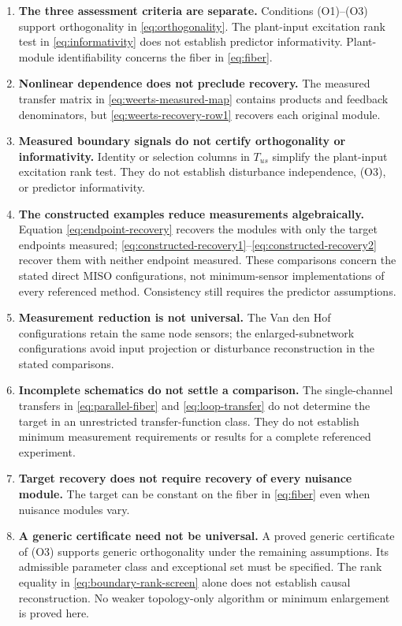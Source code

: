 \documentclass[11pt,a4paper]{article}
\begin{document}
\begin{enumerate}
  \item \textbf{The three assessment criteria are separate.}  Conditions (O1)--(O3) support orthogonality in \eqref{eq:orthogonality}.  The plant-input excitation rank test in \eqref{eq:informativity} does not establish predictor informativity.  Plant-module identifiability concerns the fiber in \eqref{eq:fiber}.

  \item \textbf{Nonlinear dependence does not preclude recovery.}  The measured transfer matrix in \eqref{eq:weerts-measured-map} contains products and feedback denominators, but \eqref{eq:weerts-recovery-row1} recovers each original module.

  \item \textbf{Measured boundary signals do not certify orthogonality or informativity.}  Identity or selection columns in $T_{us}$ simplify the plant-input excitation rank test.  They do not establish disturbance independence, (O3), or predictor informativity.

  \item \textbf{The constructed examples reduce measurements algebraically.}  Equation \eqref{eq:endpoint-recovery} recovers the modules with only the target endpoints measured; \eqref{eq:constructed-recovery1}--\eqref{eq:constructed-recovery2} recover them with neither endpoint measured.  These comparisons concern the stated direct MISO configurations, not minimum-sensor implementations of every referenced method.  Consistency still requires the predictor assumptions.

  \item \textbf{Measurement reduction is not universal.}  The Van den Hof configurations retain the same node sensors; the enlarged-subnetwork configurations avoid input projection or disturbance reconstruction in the stated comparisons.

  \item \textbf{Incomplete schematics do not settle a comparison.}  The single-channel transfers in \eqref{eq:parallel-fiber} and \eqref{eq:loop-transfer} do not determine the target in an unrestricted transfer-function class.  They do not establish minimum measurement requirements or results for a complete referenced experiment.

  \item \textbf{Target recovery does not require recovery of every nuisance module.}  The target can be constant on the fiber in \eqref{eq:fiber} even when nuisance modules vary.

  \item \textbf{A generic certificate need not be universal.}  A proved generic certificate of (O3) supports generic orthogonality under the remaining assumptions.  Its admissible parameter class and exceptional set must be specified.  The rank equality in \eqref{eq:boundary-rank-screen} alone does not establish causal reconstruction.  No weaker topology-only algorithm or minimum enlargement is proved here.
\end{enumerate}
\end{document}
